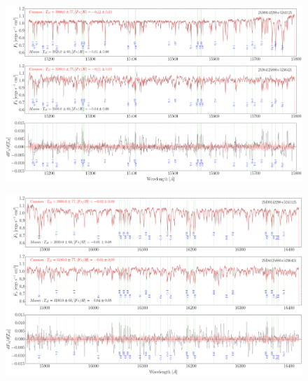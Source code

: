 \documentclass[twocolumn]{aastex62}
\begin{document}
\begin{figure}[]
	\begin{center}
	\includegraphics[width=16cm]{demo_derivatives_teff1.png} 
	\end{center}
\end{figure}

\begin{figure}[]
	\begin{center}
	\includegraphics[width=16cm]{demo_derivatives_teff2.png}
	\end{center}
\end{figure}
\end{document}
